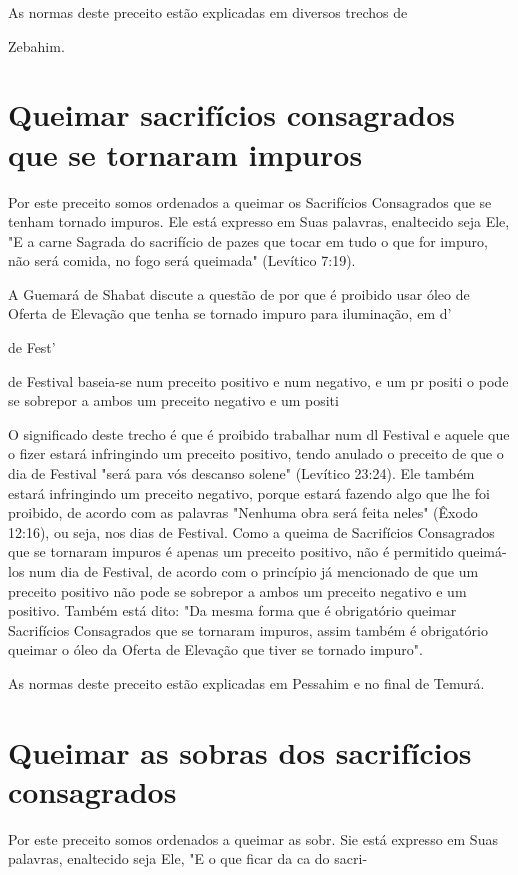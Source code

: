 \begin{itemize}
\begin{enumrate}
\begin{itemize}
\begin{itemize}
As normas deste preceito estão explicadas em diversos trechos de


Zebahim.

\section{Queimar sacrifícios consagrados que se tornaram impuros}

Por este preceito somos ordenados a queimar os Sacrifícios Consa­grados
que se tenham tornado impuros. Ele está expresso em Suas palavras,
enaltecido seja Ele, "E a carne Sagrada do sacrifício de pazes que tocar
em tudo o que for impuro, não será comida, no fogo será queimada"
(Levítico 7:19).

A Guemará de Shabat discute a questão de por que é proibido usar óleo de
Oferta de Elevação que tenha se tornado impuro para iluminação, em d'


de Fest'


de Festival baseia-se num preceito positivo e num negativo, e um pr
positi o pode se sobrepor a ambos um preceito negativo e um positi

O significado deste trecho é que é proibido trabalhar num dl Festival e
aquele que o fizer estará infringindo um preceito positivo, tendo
anu­lado o preceito de que o dia de Festival "será para vós descanso
solene" (Leví­tico 23:24). Ele também estará infringindo um preceito
negativo, porque estará fazendo algo que lhe foi proibido, de acordo com
as palavras "Nenhuma obra será feita neles" (Êxodo 12:16), ou seja, nos
dias de Festival. Como a queima de Sacrifícios Consagrados que se
tornaram impuros é apenas um preceito po­sitivo, não é permitido
queimá-los num dia de Festival, de acordo com o prin­cípio já mencionado
de que um preceito positivo não pode se sobrepor a am­bos um preceito
negativo e um positivo. Também está dito: "Da mesma forma que é
obrigatório queimar Sacrifícios Consagrados que se tornaram impuros,
assim também é obrigatório queimar o óleo da Oferta de Elevação que
tiver se tornado impuro".

As normas deste preceito estão explicadas em Pessahim e no final de
Temurá.

\section{Queimar as sobras dos sacrifícios consagrados}

Por este preceito somos ordenados a queimar as sobr. Sie está expresso
em Suas palavras, enaltecido seja Ele, "E o que ficar da ca do sacri-



\end{itemize}
\end{itemize}
\end{enumrate}
\end{itemize}
